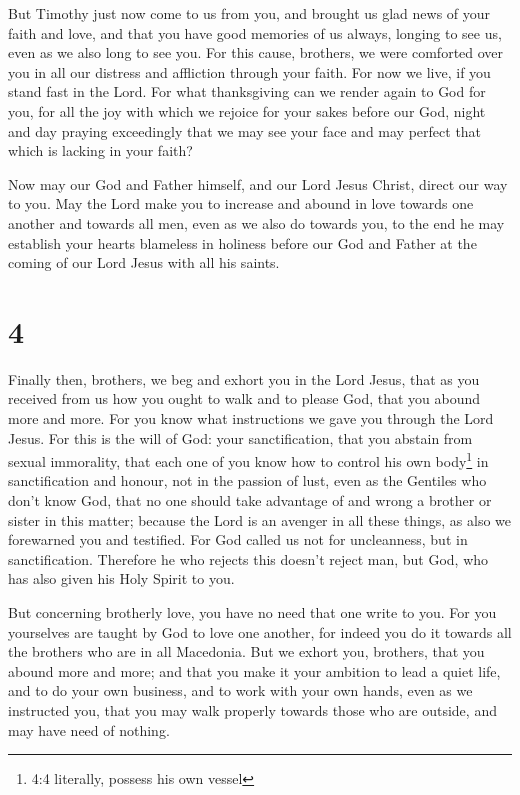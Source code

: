  But Timothy just now come to us from you, and brought us
glad news of your faith and love, and that you have good memories of us
always, longing to see us, even as we also long to see you. 
For this cause, brothers, we were comforted over you in all our distress
and affliction through your faith.  For now we live, if you
stand fast in the Lord.  For what thanksgiving can we render
again to God for you, for all the joy with which we rejoice for your
sakes before our God,  night and day praying exceedingly
that we may see your face and may perfect that which is lacking in your
faith?

 Now may our God and Father himself, and our Lord Jesus
Christ, direct our way to you.  May the Lord make you to
increase and abound in love towards one another and towards all men,
even as we also do towards you,  to the end he may
establish your hearts blameless in holiness before our God and Father at
the coming of our Lord Jesus with all his saints.

\hypertarget{section-3}{%
\section{4}\label{section-3}}

 Finally then, brothers, we beg and exhort you in the Lord
Jesus, that as you received from us how you ought to walk and to please
God, that you abound more and more.  For you know what
instructions we gave you through the Lord Jesus.  For this
is the will of God: your sanctification, that you abstain from sexual
immorality,  that each one of you know how to control his
own body\footnote{4:4 literally, possess his own vessel} in
sanctification and honour,  not in the passion of lust, even
as the Gentiles who don't know God,  that no one should take
advantage of and wrong a brother or sister in this matter; because the
Lord is an avenger in all these things, as also we forewarned you and
testified.  For God called us not for uncleanness, but in
sanctification.  Therefore he who rejects this doesn't
reject man, but God, who has also given his Holy Spirit to you.

 But concerning brotherly love, you have no need that one
write to you. For you yourselves are taught by God to love one another,
 for indeed you do it towards all the brothers who are in
all Macedonia. But we exhort you, brothers, that you abound more and
more;  and that you make it your ambition to lead a quiet
life, and to do your own business, and to work with your own hands, even
as we instructed you,  that you may walk properly towards
those who are outside, and may have need of nothing.

